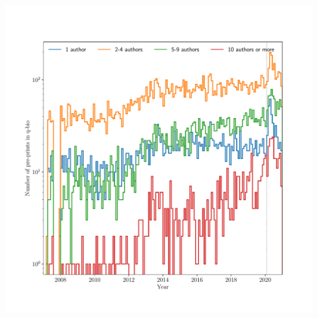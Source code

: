 \documentclass{nature}
\makeatletter
\renewenvironment*{figure}{\@float{figure}}{\end@float}
\makeatother
\begin{document}
 
  \begin{figure}
     \includegraphics[width=\textwidth]{q-bio-pre-prints-segmented-by-author-count}
     \caption{The increase in quantitative biology pre-prints in 2020 cannot be attributed to large collaborations. Here we segment q-bio pre-prints by the number of authors, showing that in 2020 a sharp increase was observed for single-author papers and small (2-4 authors) collaborations.}
     \label{fig:q-bio-pre-prints-segmented-by-author-count}
  \end{figure}
\end{document}

